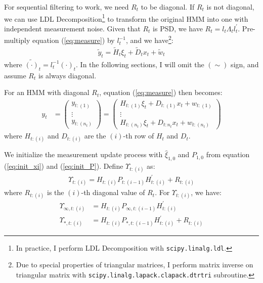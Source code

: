 \documentclass[12pt]{article}
\numberwithin{equation}{section}
\begin{document}
For sequential filtering to work, we need $R_t$ to be diagonal. If $R_t$ is not diagonal, we can use LDL Decomposition\footnote{In practice, I perform LDL Decomposition with \texttt{scipy.linalg.ldl}.} to transform the original HMM into one with independent measurement noise. Given that $R_t$ is PSD, we have $R_t = l_t\Lambda_tl_t^{'}$. Pre-multiply equation (\ref{eq:measure}) by $l_t^{-1}$, and we have\footnote{Due to special properties of triangular matrices, I perform matrix inverse on triangular matrix with \texttt{scipy.linalg.lapack.clapack.dtrtri} subroutine.}:
\begin{align}
    \tilde{y}_t = \tilde{H}_t\xi_{t} + \tilde{D}_{t}x_t + \tilde{w}_t \label{eq:ldl}
\end{align}
where $\tilde{(\cdot)}_t = l_t^{-1}(\cdot)_t$. In the following sections, I will omit the $(\sim)$ sign, and assume $R_t$ is always diagonal.

For an HMM with diagonal $R_t$, equation (\ref{eq:measure}) then becomes:
\begin{align*}
    y_t &= 
    \begin{pmatrix}
        y_{t:(1)} \\
        \vdots \\ 
        y_{t:(n_t)}
    \end{pmatrix} 
    = \begin{pmatrix}
        H_{t:(1)}\xi_t + D_{t:(1)}x_t + w_{t:(1)} \\
        \vdots \\
        H_{t:(n_t)}\xi_t + D_{t:n_t}x_t + w_{t:(n_t)}
    \end{pmatrix}
\end{align*}
where $H_{t:(i)}$ and $D_{t:(i)}$ are the $(i)$-th row of $H_t$ and $D_t$. 

We initialize the measurement update process with $\hat{\xi}_{1,0}$ and $P_{1,0}$ from equation (\ref{eq:init_xi}) and (\ref{eq:init_P}). Define $\Upsilon_{t:(i)}$ as:
\begin{align*}
    \Upsilon_{t:(i)} = H_{t:(i)}P_{t:(i-1)}H_{t:(i)}^{'} + R_{t:(i)}
\end{align*}
where $R_{t:(i)}$ is the $(i)$-th diagonal value of $R_{t}$. For $\Upsilon_{t:(i)}$, we have:
\begin{align*}
    \Upsilon_{\infty, t:(i)} &= H_{t:(i)}P_{\infty, t:(i-1)}H_{t:(i)}^{'} \\
    \Upsilon_{*,t:(i)} &= H_{t:(i)}P_{*,t:(i-1)}H_{t:(i)}^{'} + R_{t:(i)}
\end{align*}
\end{document}
